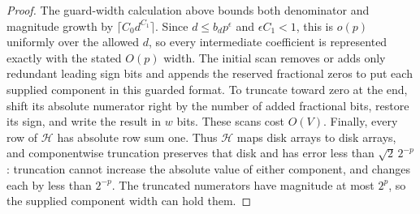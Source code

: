 \begin{proof}
The guard-width calculation above bounds both denominator and magnitude
growth by $\lceil C_0d^{C_1}\rceil$. Since $d\le b_dp^\epsilon$ and
$\epsilon C_1<1$, this is $o(p)$ uniformly over the allowed $d$, so
every intermediate coefficient is represented exactly with
the stated $O(p)$ width. The initial scan removes or adds only
redundant leading sign bits and appends the reserved fractional zeros
to put each supplied component in this guarded format. To truncate
toward zero at the end, shift its absolute numerator right by the
number of added fractional bits, restore its sign, and write the
result in $w$ bits. These scans cost $O(V)$.
Finally, every row of $\mathcal H$ has
absolute row sum one. Thus $\mathcal H$ maps disk arrays to disk
arrays, and componentwise truncation preserves that disk and has
error less than $\sqrt2\,2^{-p}$: truncation cannot increase the
absolute value of either component, and changes each by less than
$2^{-p}$. The truncated numerators have magnitude at most $2^p$,
so the supplied component width can hold them.
\end{proof}
